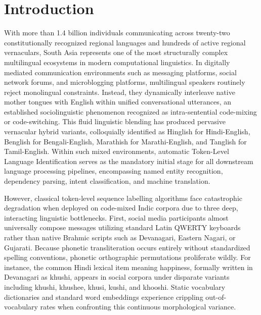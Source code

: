 \documentclass[10pt,twocolumn,letterpaper]{article}
\theoremstyle{definition}
\begin{document}
\section{Introduction}
With more than 1.4 billion individuals communicating across twenty-two constitutionally recognized regional languages and hundreds of active regional vernaculars, South Asia represents one of the most structurally complex multilingual ecosystems in modern computational linguistics. In digitally mediated communication environments such as messaging platforms, social network forums, and microblogging platforms, multilingual speakers routinely reject monolingual constraints. Instead, they dynamically interleave native mother tongues with English within unified conversational utterances, an established sociolinguistic phenomenon recognized as intra-sentential code-mixing or code-switching. This fluid linguistic blending has produced pervasive vernacular hybrid variants, colloquially identified as Hinglish for Hindi-English, Benglish for Bengali-English, Marathish for Marathi-English, and Tanglish for Tamil-English. Within such mixed environments, automatic Token-Level Language Identification serves as the mandatory initial stage for all downstream language processing pipelines, encompassing named entity recognition, dependency parsing, intent classification, and machine translation.

However, classical token-level sequence labelling algorithms face catastrophic degradation when deployed on code-mixed Indic corpora due to three deep, interacting linguistic bottlenecks. First, social media participants almost universally compose messages utilizing standard Latin QWERTY keyboards rather than native Brahmic scripts such as Devanagari, Eastern Nagari, or Gujarati. Because phonetic transliteration occurs entirely without standardized spelling conventions, phonetic orthographic permutations proliferate wildly. For instance, the common Hindi lexical item meaning happiness, formally written in Devanagari as khushi, appears in social corpora under disparate variants including khushi, khushee, khusi, kushi, and khooshi. Static vocabulary dictionaries and standard word embeddings experience crippling out-of-vocabulary rates when confronting this continuous morphological variance.
\end{document}
